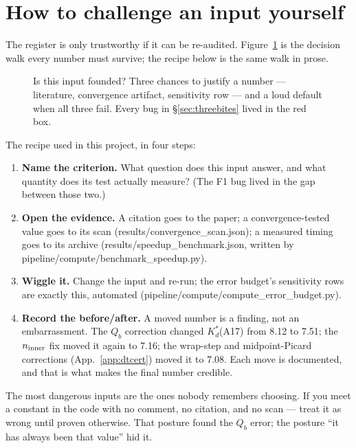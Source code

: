 \documentclass[11pt]{report}
\newcommand{\code}[1]{{\ttfamily\small #1}}
\begin{document}
\section{How to challenge an input yourself}\label{sec:challenge}

The register is only trustworthy if it can be re-audited.
Figure~\ref{fig:inputflow} is the decision walk every number must survive;
the recipe below is the same walk in prose.

\begin{figure}[htbp]\centering

\caption{Is this input founded? Three chances to justify a number ---
literature, convergence artifact, sensitivity row --- and a loud default when
all three fail. Every bug in \S\ref{sec:threebites} lived in the red box.}
\label{fig:inputflow}
\end{figure}

The recipe used in this project, in four steps:

\begin{enumerate}[leftmargin=1.6em,itemsep=2pt]
\item \textbf{Name the criterion.} What question does this input answer, and
  what quantity does its test actually measure? (The F1 bug lived in the gap
  between those two.)
\item \textbf{Open the evidence.} A citation goes to the paper; a
  convergence-tested value goes to its scan
  (\code{results/convergence\_scan.json}); a measured timing goes to its
  archive (\code{results/speedup\_benchmark.json}, written by
  \code{pipeline/compute/benchmark\_speedup.py}).
\item \textbf{Wiggle it.} Change the input and re-run; the error budget's
  sensitivity rows are exactly this, automated
  (\code{pipeline/compute/compute\_error\_budget.py}).
\item \textbf{Record the before/after.} A moved number is a finding, not an
  embarrassment. The $Q_b$ correction changed $K_d^{*}$(A17) from 8.12 to 7.51;
  the $n_{\rm inner}$ fix moved it again to 7.16; the wrap-step and
  midpoint-Picard corrections (App.~\ref{app:dtcert}) moved it to 7.08. Each
  move is documented, and
  that is what makes the final number credible.
\end{enumerate}

\begin{warn}
The most dangerous inputs are the ones nobody remembers choosing. If you meet
a constant in the code with no comment, no citation, and no scan --- treat it
as wrong until proven otherwise. That posture found the $Q_b$ error; the
posture ``it has always been that value'' hid it.
\end{warn}
\end{document}
